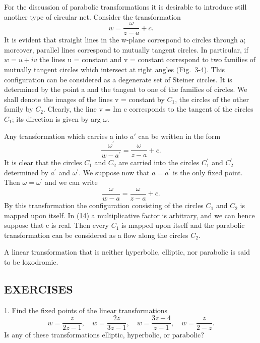 For the discussion of parabolic transformations it is desirable to introduce still another type of circular net. Consider the transformation
\begin{equation*}
w = \frac {\omega}{z - a} + c.
\end{equation*}
It is evident that straight lines in the w-plane correspond to circles through a; moreover, parallel lines correspond to mutually tangent circles. In particular, if $w = u + iv$ the lines u = constant and v = constant correspond to two families of mutually tangent circles which intersect at right angles (Fig.~\hyperref[fig:3-4]{3-4}). This configuration can be considered as a degenerate set of Steiner circles. It is determined by the point a and the tangent to one of the families of circles. We shall denote the images of the lines v = constant by $C_{1}$, the circles of the other family by $C_{2}$. Clearly, the line v = Im c corresponds to the tangent of the circles $C_{1}$; its direction is given by arg $\omega$.


Any transformation which carries a into $a'$ can be written in the form
\begin{equation*}
\frac {\omega^ {\prime}}{w - a ^ {\prime}} = \frac {\omega}{z - a} + c.
\end{equation*}
It is clear that the circles $C_{1}$ and $C_{2}$ are carried into the circles $C_{1}^{\prime}$ and $C_{2}^{\prime}$ determined by $a^{\prime}$ and $\omega^{\prime}$. We suppose now that $a = a^{\prime}$ is the only fixed point. Then $\omega = \omega^{\prime}$ and we can write
\begin{equation*}
\frac {\omega}{w - a} = \frac {\omega}{z - a} + c.\tag{14}\label{eq:3.14}
\end{equation*}
By this transformation the configuration consisting of the circles $C_{1}$ and $C_{2}$ is mapped upon itself. In \hyperref[eq:3.14]{(14)} a multiplicative factor is arbitrary, and we can hence suppose that c is real. Then every $C_{1}$ is mapped upon itself and the parabolic transformation can be considered as a flow along the circles $C_{2}$.

A linear transformation that is neither hyperbolic, elliptic, nor parabolic is said to be loxodromic.

\subsection*{EXERCISES}
1. Find the fixed points of the linear transformations
\begin{equation*}
w = \frac {z}{2 z - 1}, \quad w = \frac {2 z}{3 z - 1}, \quad w = \frac {3 z - 4}{z - 1}, \quad w = \frac {z}{2 - z}.
\end{equation*}
Is any of these transformations elliptic, hyperbolic, or parabolic?

